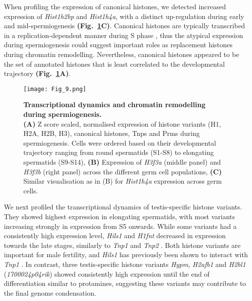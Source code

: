 When profiling the expression of canonical histones, we detected increased expression of \textit{Hist1h2bp} and \textit{Hist1h4a}, with a distinct up-regulation during early and mid-spermiogenesis \textbf{(Fig.~\ref{fig3:spermiogenesis}C)}. 
Canonical histones are typically transcribed in a replication-dependent manner during S phase \citep{Marzluff2002}, thus the atypical expression during spermiogenesis could suggest important roles as replacement histones during chromatin remodelling. 
Nevertheless, canonical histones appeared to be the set of annotated histones that is least correlated to the developmental trajectory \textbf{(Fig.~\ref{fig3:spermiogenesis}A)}.

\begin{figure}[!h]
\centering
\texttt{[image: Fig\_9.png]}
\caption[Transcriptional dynamics and chromatin remodelling during spermiogenesis]{\textbf{Transcriptional dynamics and chromatin remodelling during spermiogenesis.} \\
\textbf{(A)} Z score scaled, normalised expression of histone variants (H1, H2A, H2B, H3), canonical histones, \glspl{Tnp} and \glspl{Prm} during spermiogenesis. 
Cells were ordered based on their developmental trajectory ranging from round spermatids (S1-S8) to elongating spermatids (S9-S14), 
\textbf{(B)} Expression of \textit{H3f3a} (middle panel) and \textit{H3f3b} (right panel) across the different germ cell populations, 
\textbf{(C)} Similar visualisation as in (B) for \textit{Hist1h4a} expression across germ cells. }
\label{fig3:spermiogenesis}
\end{figure}

\newpage

We next profiled the transcriptional dynamics of testis-specific histone variants. 
They showed highest expression in elongating spermatids, with most variants increasing strongly in expression from S5 onwards. 
While some variants had a consistently high expression level, \textit{Hils1} and \textit{H1fnt} decreased in expression towards the late stages, similarly to \textit{Tnp1} and \textit{Tnp2} \citep{Zhao2004}. 
Both histone variants are important for male fertility, and \textit{Hils1} has previously been shown to interact with \textit{Tnp1} \citep{Tanaka2005}. 
In contrast, three testis-specific histone variants \textit{Hypm}, \textit{H2afb1} and \textit{H2bl1} (\textit{1700024p04rik}) showed consistently high expression until the end of differentiation similar to protamines, suggesting these variants may contribute to the final genome condensation.

